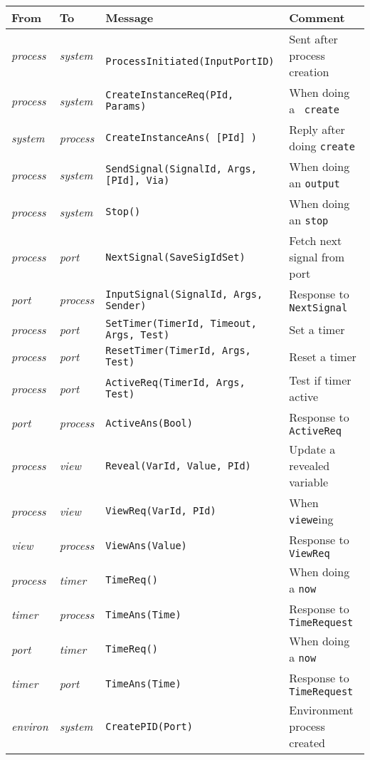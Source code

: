 \begin{table}
\small
\begin{tabular}{|l|l|l|l|}
\hline
From & To & Message & Comment\\
\hline
{\em process} & {\em system} & {\tt
ProcessInitiated(InputPortID)}&
Sent after process creation\\
{\em process} & {\em system} & {\tt CreateInstanceReq(PId, Params)} & When doing a {\tt
create}\\
{\em system} & {\em process} & {\tt CreateInstanceAns( [PId] )} &
Reply after doing {\tt create}\\
{\em process} & {\em system} & {\tt SendSignal(SignalId, Args,
[PId], Via)} & When doing an {\tt output}\\
{\em process} & {\em system} & {\tt Stop()} & When doing an {\tt stop}\\
\hline
{\em process} & {\em port} & {\tt NextSignal(SaveSigIdSet)} & 
Fetch next signal from port\\
{\em port} & {\em process} & {\tt InputSignal(SignalId,
Args, Sender)} & Response to {\tt NextSignal}\\
{\em process} & {\em port} & {\tt SetTimer(TimerId,
Timeout, Args, Test)} & Set a timer\\
{\em process} & {\em port} & {\tt ResetTimer(TimerId, Args,
Test)} & Reset a timer\\
{\em process} & {\em port} & {\tt ActiveReq(TimerId, Args,
Test)} & Test if timer active\\
{\em port} & {\em process} & {\tt ActiveAns(Bool)} & 
Response to {\tt ActiveReq}\\
\hline
{\em process} & {\em view} & {\tt Reveal(VarId, Value, PId)} &
Update a revealed variable\\
{\em process} & {\em view} & {\tt ViewReq(VarId, PId)} & When
{\tt viewe}ing\\
{\em view} & {\em process} & {\tt ViewAns(Value)} & Response to
{\tt ViewReq}\\
\hline
{\em process} & {\em timer} & {\tt TimeReq()} &
When doing a {\tt now}\\
{\em timer} & {\em process} & {\tt TimeAns(Time)} &
Response to {\tt TimeRequest}\\
{\em port} & {\em timer} & {\tt TimeReq()} &
When doing a {\tt now}\\
{\em timer} & {\em port} & {\tt TimeAns(Time)} &
Response to {\tt TimeRequest}\\
\hline
{\em environ} & {\em system} & {\tt CreatePID(Port)} &
Environment process created\\

\end{tabular}
\end{table}
